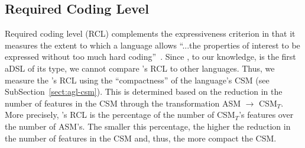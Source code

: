 \subsection{Required Coding Level} \label{sect:eval-rcl}
Required coding level (RCL) complements the expressiveness criterion in that it measures the extent to which a language allows ``...the properties of interest to be expressed without too much hard coding''~\cite{lamsweerde_formal_2000}.
Since \agl, to our knowledge, is the first aDSL of its type, we cannot compare \agl's RCL to other languages. Thus, we measure the \agl's RCL using the ``compactness'' of the language's CSM (see SubSection~\ref{sect:agl-csm}). This is determined based on the reduction in the number of features in the CSM through the transformation ASM $\rightarrow$ CSM$_T$. More precisely, \agl's RCL is the percentage of the number of CSM$_T$'s features over the number of ASM's. The smaller this percentage, the higher the reduction in the number of features in the CSM and, thus, the more compact the CSM.
%

